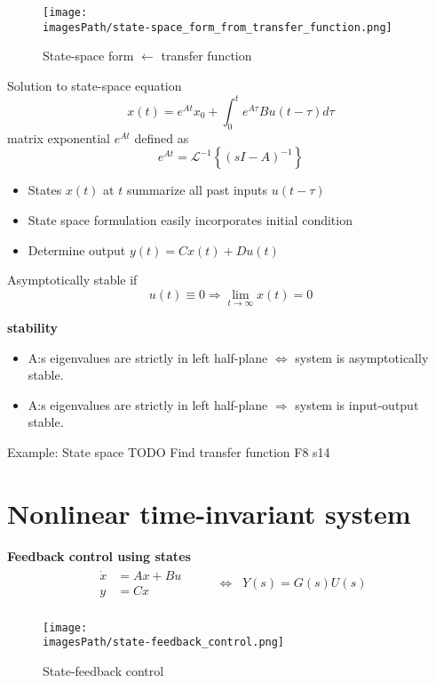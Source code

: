 \documentclass{article}
\newcommand{\imagesPath}{images}
\begin{document}
\begin{figure}[!h]
    \centering
    \texttt{[image: \\imagesPath/state-space\_form\_from\_transfer\_function.png]}
    \caption{State-space form $\leftarrow$ transfer function}
\end{figure}

Solution to state-space equation
\begin{equation*}
    x(t) = e^{At}x_0 + \int_{0}^{t} e^{A\tau} Bu(t-\tau)d\tau
\end{equation*}
matrix exponential $e^{At}$ defined as
\begin{equation*}
    e^{At} = \mathcal{L}^{-1}\left\{ (sI-A)^{-1} \right\}
\end{equation*}

\begin{itemize}
    \item States $x(t)$ at $t$ summarize all past inputs $u(t-\tau)$
    \item State space formulation easily incorporates initial condition
    \item Determine output $y(t) = Cx(t) + Du(t)$
\end{itemize}

Asymptotically stable if 
\begin{equation*}
    u(t) \equiv 0 \Rightarrow \lim_{t\to\infty} x(t) = 0
\end{equation*}

\textbf{stability}
\begin{itemize}
    \item A:s eigenvalues are strictly in left half-plane $\Leftrightarrow$ system is asymptotically stable.
    \item A:s eigenvalues are strictly in left half-plane $\Rightarrow$ system is input-output stable.
\end{itemize}

\begin{exampleblock}{Example: State space}
   TODO  Find transfer function F8 s14
\end{exampleblock}

\section{Nonlinear time-invariant system}
\textbf{Feedback control using states}
\begin{align*}
    \begin{aligned} 
        \dot{x} &= Ax + Bu \\
        y &= Cx 
    \end{aligned}& && \Leftrightarrow \;\; Y(s) = G(s)U(s) \\
\end{align*}
\begin{figure}[!h]
    \centering
    \texttt{[image: \\imagesPath/state-feedback\_control.png]}
    \caption{State-feedback control}
\end{figure}
\end{document}
